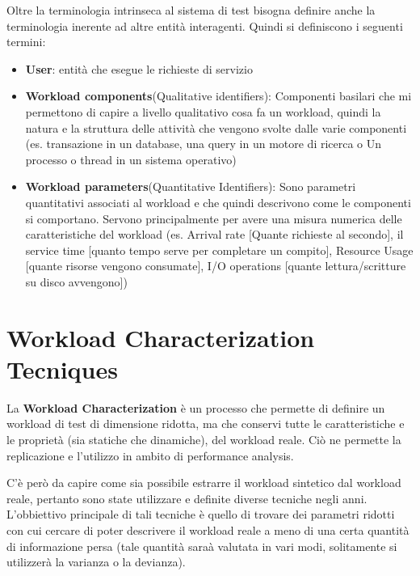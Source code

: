 Oltre la terminologia intrinseca al sistema di test bisogna definire anche la terminologia inerente ad altre entità interagenti. Quindi si definiscono i seguenti termini:
\begin{itemize}
    \item \textbf{User}: entità che esegue le richieste di servizio
    \item \textbf{Workload components}(Qualitative identifiers): Componenti basilari che mi permettono di capire a livello qualitativo cosa fa un workload, quindi la natura e la struttura delle attività che vengono svolte dalle varie componenti (es. transazione in un database, una query in un motore di ricerca o Un processo o thread in un sistema operativo)
    \item \textbf{Workload parameters}(Quantitative Identifiers): Sono parametri quantitativi associati al workload e che quindi descrivono come le componenti si comportano. Servono principalmente per avere una misura numerica delle caratteristiche del workload (es. Arrival rate [Quante richieste al secondo], il service time [quanto tempo serve per completare un compito], Resource Usage [quante risorse vengono consumate], I/O operations [quante lettura/scritture su disco avvengono])
\end{itemize}

\section{Workload Characterization Tecniques}
\begin{info}
La \textbf{Workload Characterization} è un processo che permette di definire un workload di test di dimensione ridotta, ma che conservi tutte le caratteristiche e le proprietà (sia statiche che dinamiche), del workload reale. Ciò ne permette la replicazione e l'utilizzo in ambito di performance analysis.
\end{info}
C'è però da capire come sia possibile estrarre il workload sintetico dal workload reale, pertanto sono state utilizzare e definite diverse tecniche negli anni. L'obbiettivo principale di tali tecniche è quello di trovare dei parametri ridotti con cui cercare di poter descrivere il workload reale a meno di una certa quantità di informazione persa (tale quantità saraà valutata in vari modi, solitamente si utilizzerà la varianza o la devianza).


